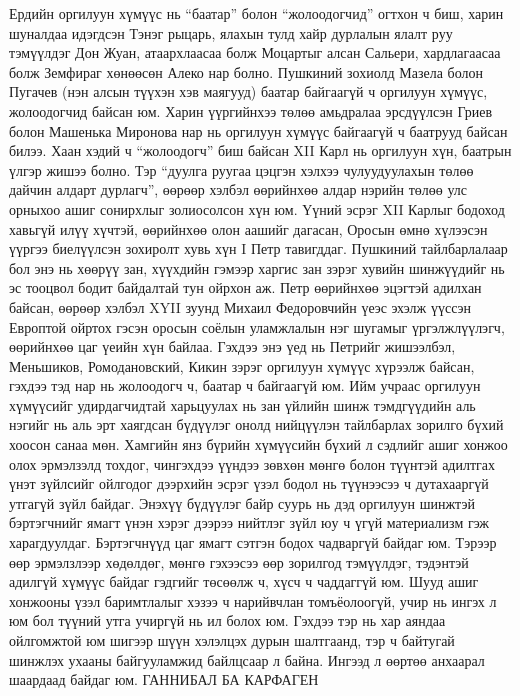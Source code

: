 Ердийн оргилуун хүмүүс нь “баатар” болон “жолоодогчид” огтхон ч биш, харин шуналдаа идэгдсэн Тэнэг рыцарь, ялахын тулд хайр дурлалын ялалт руу тэмүүлдэг Дон Жуан, атаархлаасаа болж Моцартыг алсан Сальери, хардлагаасаа болж Земфираг хөнөөсөн Алеко нар болно. Пушкиний зохиолд Мазела болон Пугачев (нэн алсын түүхэн хэв маягууд) баатар байгаагүй ч оргилуун хүмүүс, жолоодогчид байсан юм. Харин үүргийнхээ төлөө амьдралаа эрсдүүлсэн Гриев болон Машенька Миронова нар нь оргилуун хүмүүс байгаагүй ч баатрууд байсан билээ. Хаан хэдий ч “жолоодогч” биш байсан XII Карл нь оргилуун хүн, баатрын үлгэр жишээ болно. Тэр “дуулга руугаа цэцгэн хэлхээ чулуудуулахын төлөө дайчин алдарт дурлагч”, өөрөөр хэлбэл өөрийнхөө алдар нэрийн төлөө улс орныхоо ашиг сонирхлыг золиосолсон хүн юм. Үүний эсрэг XII Карлыг бодоход хавьгүй илүү хүчтэй, өөрийнхөө олон аашийг дагасан, Оросын өмнө хүлээсэн үүргээ биелүүлсэн зохиролт хувь хүн I Петр тавигддаг. Пушкиний тайлбарлалаар бол энэ нь хөөрүү зан, хүүхдийн гэмээр харгис зан зэрэг хувийн шинжүүдийг нь эс тооцвол бодит байдалтай тун ойрхон аж. Петр өөрийнхөө эцэгтэй адилхан байсан, өөрөөр хэлбэл XYII зуунд Михаил Федоровчийн үеэс эхэлж үүссэн Европтой ойртох гэсэн оросын соёлын уламжлалын нэг шугамыг үргэлжлүүлэгч, өөрийнхөө цаг үеийн хүн байлаа. Гэхдээ энэ үед нь Петрийг жишээлбэл, Меньшиков, Ромодановский, Кикин зэрэг оргилуун хүмүүс хүрээлж байсан, гэхдээ тэд нар нь жолоодогч ч, баатар ч байгаагүй юм. Ийм учраас оргилуун хүмүүсийг удирдагчидтай харьцуулах нь зан үйлийн шинж тэмдгүүдийн аль нэгийг нь аль эрт хаягдсан бүдүүлэг онолд нийцүүлэн тайлбарлах зорилго бүхий хоосон санаа мөн.
Хамгийн янз бүрийн хүмүүсийн бүхий л сэдлийг ашиг хонжоо олох эрмэлзэлд тохдог, чингэхдээ үүндээ зөвхөн мөнгө болон түүнтэй адилтгах үнэт зүйлсийг ойлгодог дээрхийн эсрэг үзэл бодол нь түүнээсээ ч дутахааргүй утгагүй зүйл байдаг. Энэхүү бүдүүлэг байр суурь нь дэд оргилуун шинжтэй бэртэгчнийг ямагт үнэн хэрэг дээрээ нийтлэг зүйл юу ч үгүй материализм гэж харагдуулдаг. Бэртэгчнүүд цаг ямагт сэтгэн бодох чадваргүй байдаг юм.
Тэрээр өөр эрмэлзлээр хөдөлдөг, мөнгө гэхээсээ өөр зорилгод тэмүүлдэг, тэдэнтэй адилгүй хүмүүс байдаг гэдгийг төсөөлж ч, хүсч ч чаддаггүй юм. Шууд ашиг хонжооны үзэл баримтлалыг хэзээ ч нарийвчлан томъёолоогүй, учир нь ингэх л юм бол түүний утга учиргүй нь ил болох юм. Гэхдээ тэр нь хар аяндаа ойлгомжтой юм шигээр шүүн хэлэлцэх дурын шалтгаанд, тэр ч байтугай шинжлэх ухааны байгууламжид байлцсаар л байна. Ингээд л өөртөө анхаарал шаардаад байдаг юм.
ГАННИБАЛ БА КАРФАГЕН
